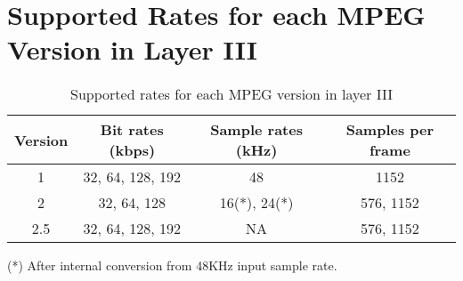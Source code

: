 \documentclass{ug}
\theoremstyle{plain}
\begin{document}
\section{Supported Rates for each MPEG Version in Layer III}
\label{sec:rates}

\begin{table}[H]
  \begin{center}
    \begin{tabular}{|c|c|c|c|}
      \hline

      \rowcolor{iob-green}
      \textbf{Version} & \textbf{Bit rates (kbps)} & \textbf{Sample rates (kHz)} & \textbf{Samples per frame}\\
      \hline
      \hline

      1 & 32, 64, 128, 192 & 48 & 1152\\ \hline

      \rowcolor{iob-blue} 
      2 & 32, 64, 128 & 16(*), 24(*) & 576, 1152\\ \hline

      2.5 & 32, 64, 128, 192 & NA & 576, 1152\\ \hline

    \end{tabular}
    \caption{Supported rates for each MPEG version in layer III}
    \label{tab:rates}
  \end{center}

  (*) After internal conversion from 48KHz input sample rate.
    
\end{table}

%
%
\end{document}
